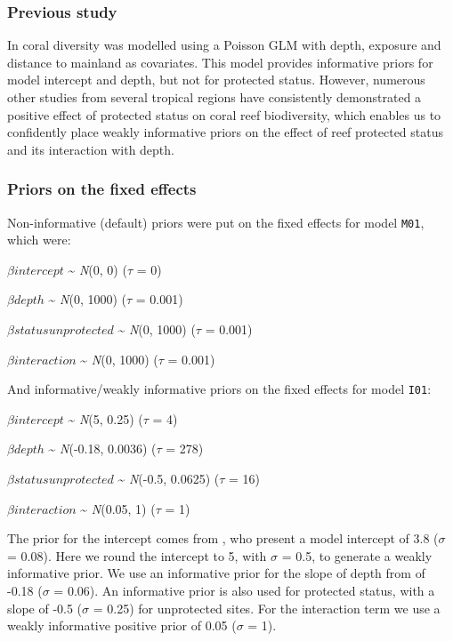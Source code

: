 \documentclass[
]{book}
\begin{document}
\hypertarget{previous-study}{%
\subsubsection{Previous study}\label{previous-study}}

In \citet{Waheed_2015} coral diversity was modelled using a Poisson GLM with depth, exposure and distance to mainland as covariates. This model provides informative priors for model intercept and depth, but not for protected status. However, numerous other studies from several tropical regions have consistently demonstrated a positive effect of protected status on coral reef biodiversity, which enables us to confidently place weakly informative priors on the effect of reef protected status and its interaction with depth.

\hypertarget{nb-priors-fixed}{%
\subsubsection{Priors on the fixed effects}\label{nb-priors-fixed}}

Non-informative (default) priors were put on the fixed effects for model \texttt{M01}, which were:

\(\beta intercept\) \textasciitilde{} \emph{N}(0, 0) (\(\tau\) = 0)

\(\beta depth\) \textasciitilde{} \emph{N}(0, 1000) (\(\tau\) = 0.001)

\(\beta statusunprotected\) \textasciitilde{} \emph{N}(0, 1000) (\(\tau\) = 0.001)

\(\beta interaction\) \textasciitilde{} \emph{N}(0, 1000) (\(\tau\) = 0.001)

And informative/weakly informative priors on the fixed effects for model \texttt{I01}:

\(\beta intercept\) \textasciitilde{} \emph{N}(5, 0.25) (\(\tau\) = 4)

\(\beta depth\) \textasciitilde{} \emph{N}(-0.18, 0.0036) (\(\tau\) = 278)

\(\beta statusunprotected\) \textasciitilde{} \emph{N}(-0.5, 0.0625) (\(\tau\) = 16)

\(\beta interaction\) \textasciitilde{} \emph{N}(0.05, 1) (\(\tau\) = 1)

The prior for the intercept comes from \citet{Waheed_2015}, who present a model intercept of 3.8 (\(\sigma\) = 0.08). Here we round the intercept to 5, with \(\sigma\) = 0.5, to generate a weakly informative prior. We use an informative prior for the slope of depth from \citet{Waheed_2015} of -0.18 (\(\sigma\) = 0.06). An informative prior is also used for protected status, with a slope of -0.5 (\(\sigma\) = 0.25) for unprotected sites. For the interaction term we use a weakly informative positive prior of 0.05 (\(\sigma\) = 1).
\end{document}
